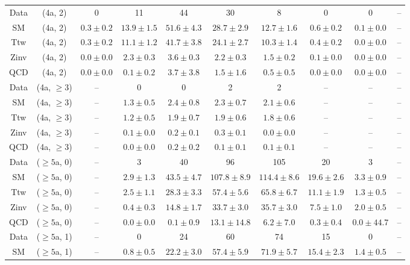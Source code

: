 \begin{table}[h!]
{\begin{tabular}{cccccccccc}
	Data & (4a, 2) & 0 & 11 & 44 & 30 & 8 & 0 & 0 & -- \\[0.5ex] 
	SM & (4a, 2) & $0.3\pm 0.2$ & $13.9\pm 1.5$ & $51.6\pm 4.3$ & $28.7\pm 2.9$ & $12.7\pm 1.6$ & $0.6\pm 0.2$ & $0.1\pm 0.0$ & -- \\[0.5ex] 
	Ttw & (4a, 2) & $0.3\pm 0.2$ & $11.1\pm 1.2$ & $41.7\pm 3.8$ & $24.1\pm 2.7$ & $10.3\pm 1.4$ & $0.4\pm 0.2$ & $0.0\pm 0.0$ & -- \\[0.5ex] 
	Zinv & (4a, 2) & $0.0\pm 0.0$ & $2.3\pm 0.3$ & $3.6\pm 0.3$ & $2.2\pm 0.3$ & $1.5\pm 0.2$ & $0.1\pm 0.0$ & $0.0\pm 0.0$ & -- \\[0.5ex] 
	QCD & (4a, 2) & $0.0\pm 0.0$ & $0.1\pm 0.2$ & $3.7\pm 3.8$ & $1.5\pm 1.6$ & $0.5\pm 0.5$ & $0.0\pm 0.0$ & $0.0\pm 0.0$ & -- \\[0.5ex] 
	Data & (4a, $\ge3$) & -- & 0 & 0 & 2 & 2 & -- & -- & -- \\[0.5ex] 
	SM & (4a, $\ge3$) & -- & $1.3\pm 0.5$ & $2.4\pm 0.8$ & $2.3\pm 0.7$ & $2.1\pm 0.6$ & -- & -- & -- \\[0.5ex] 
	Ttw & (4a, $\ge3$) & -- & $1.2\pm 0.5$ & $1.9\pm 0.7$ & $1.9\pm 0.6$ & $1.8\pm 0.6$ & -- & -- & -- \\[0.5ex] 
	Zinv & (4a, $\ge3$) & -- & $0.1\pm 0.0$ & $0.2\pm 0.1$ & $0.3\pm 0.1$ & $0.0\pm 0.0$ & -- & -- & -- \\[0.5ex] 
	QCD & (4a, $\ge3$) & -- & $0.0\pm 0.0$ & $0.2\pm 0.2$ & $0.1\pm 0.1$ & $0.1\pm 0.1$ & -- & -- & -- \\[0.5ex] 
	Data & ($\ge5$a, 0) & -- & 3 & 40 & 96 & 105 & 20 & 3 & -- \\[0.5ex] 
	SM & ($\ge5$a, 0) & -- & $2.9\pm 1.3$ & $43.5\pm 4.7$ & $107.8\pm 8.9$ & $114.4\pm 8.6$ & $19.6\pm 2.6$ & $3.3\pm 0.9$ & -- \\[0.5ex] 
	Ttw & ($\ge5$a, 0) & -- & $2.5\pm 1.1$ & $28.3\pm 3.3$ & $57.4\pm 5.6$ & $65.8\pm 6.7$ & $11.1\pm 1.9$ & $1.3\pm 0.5$ & -- \\[0.5ex] 
	Zinv & ($\ge5$a, 0) & -- & $0.4\pm 0.3$ & $14.8\pm 1.7$ & $33.7\pm 3.0$ & $35.7\pm 3.0$ & $7.5\pm 1.0$ & $2.0\pm 0.5$ & -- \\[0.5ex] 
	QCD & ($\ge5$a, 0) & -- & $0.0\pm 0.0$ & $0.1\pm 0.9$ & $13.1\pm 14.8$ & $6.2\pm 7.0$ & $0.3\pm 0.4$ & $0.0\pm 44.7$ & -- \\[0.5ex] 
	Data & ($\ge5$a, 1) & -- & 0 & 24 & 60 & 74 & 15 & 0 & -- \\[0.5ex] 
	SM & ($\ge5$a, 1) & -- & $0.8\pm 0.5$ & $22.2\pm 3.0$ & $57.4\pm 5.9$ & $71.9\pm 5.7$ & $15.4\pm 2.3$ & $1.4\pm 0.5$ & -- \\[0.5ex] 

\end{tabular}}
\end{table}
